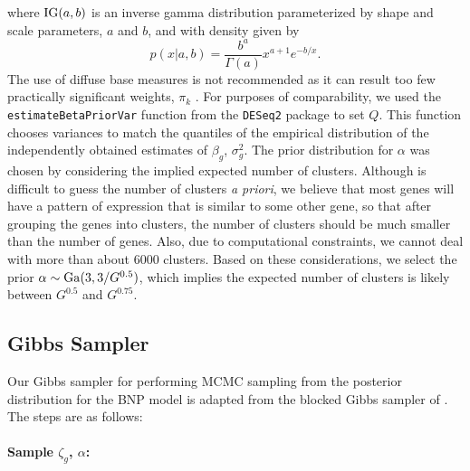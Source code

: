 \begin{itemize}
where $\operatorname{IG}(a,b)$ is an inverse gamma distribution parameterized by shape and scale parameters, $a$ and $b$, and with density given by
\begin{equation*}
p(x|a,b) = \frac{b^a}{\Gamma(a)}x^{a+1}e^{-b/x}.
\end{equation*}
The use of diffuse base measures is not recommended as it can result too few practically significant weights, $\pi_k$ \citep[p.554]{gelman-book}. For purposes of comparability, we used the \texttt{estimateBetaPriorVar} function from the \texttt{DESeq2} package to set $Q$. This function chooses variances to match the quantiles of the empirical distribution of the independently obtained estimates of $\beta_g$, $\sigma_g^2$. The prior distribution for $\alpha$ was chosen by considering the implied expected number of clusters. Although is difficult to guess the number of clusters \textit{a priori}, we believe that most genes will have a pattern of expression that is similar to some other gene, so that after grouping the genes into clusters, the number of clusters should be much smaller than the number of genes. Also, due to computational constraints, we cannot deal with more than about 6000 clusters. Based on these considerations, we select the prior $\alpha \sim \operatorname{Ga}(3,3/G^{0.5})$, which implies the expected number of clusters is likely between $G^{0.5}$ and $G^{0.75}$.


\subsection{Gibbs Sampler}
Our Gibbs sampler for performing MCMC sampling from the posterior distribution for the BNP model is adapted from the blocked Gibbs sampler of \citet{ishwaran2000}. The steps are as follows:

\paragraph{Sample $\zeta_g$, $\alpha$:}


\end{itemize}
